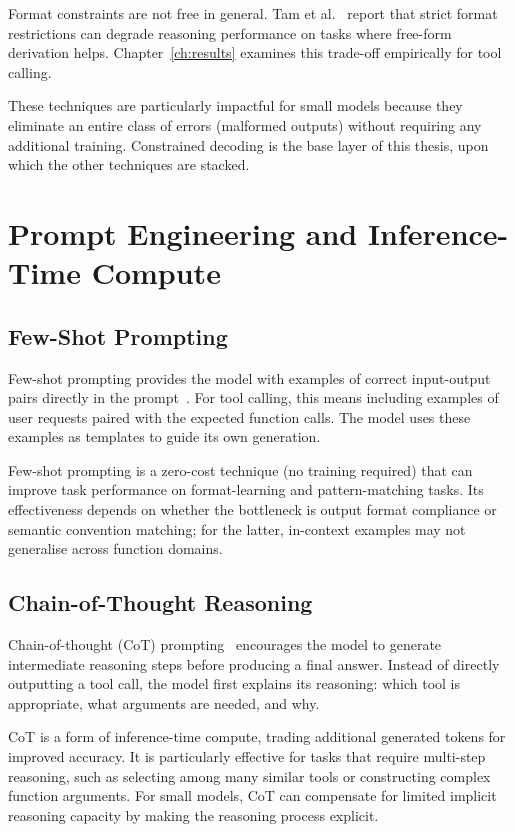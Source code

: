 Format constraints are not free in general. Tam et al.~\cite{tam2024letmespeak} report that strict format restrictions can degrade reasoning performance on tasks where free-form derivation helps. Chapter~\ref{ch:results} examines this trade-off empirically for tool calling.

These techniques are particularly impactful for small models because they eliminate an entire class of errors (malformed outputs) without requiring any additional training. Constrained decoding is the base layer of this thesis, upon which the other techniques are stacked.

\section{Prompt Engineering and Inference-Time Compute}

\subsection{Few-Shot Prompting}

Few-shot prompting provides the model with examples of correct input-output pairs directly in the prompt~\cite{brown2020language}. For tool calling, this means including examples of user requests paired with the expected function calls. The model uses these examples as templates to guide its own generation.

Few-shot prompting is a zero-cost technique (no training required) that can improve task performance on format-learning and pattern-matching tasks. Its effectiveness depends on whether the bottleneck is output format compliance or semantic convention matching; for the latter, in-context examples may not generalise across function domains.

\subsection{Chain-of-Thought Reasoning}

Chain-of-thought (CoT) prompting~\cite{wei2022chain} encourages the model to generate intermediate reasoning steps before producing a final answer. Instead of directly outputting a tool call, the model first explains its reasoning: which tool is appropriate, what arguments are needed, and why.

CoT is a form of inference-time compute, trading additional generated tokens for improved accuracy. It is particularly effective for tasks that require multi-step reasoning, such as selecting among many similar tools or constructing complex function arguments. For small models, CoT can compensate for limited implicit reasoning capacity by making the reasoning process explicit.


